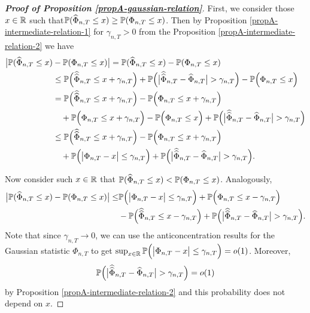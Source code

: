 \documentclass[a4paper,12pt]{article}
\makeatletter
\renewcommand{\eqref}[1]{\tagform@{\ref{#1}}}
\newcommand{\doublehattwo}[1]{\widehat{\widehat{#1}}}
\makeatother
\begin{document}
\begin{proof}[\textnormal{\textbf{Proof of Proposition \ref{propA-gaussian-relation}}}] 
First, we consider those $x\in \mathbb{R}$ such that\linebreak $\mathbb{P}(\widehat{\Phi}_{n,T} \le x) \geq \mathbb{P}(\Phi_{n, T} \le x)$. Then by Proposition \ref{propA-intermediate-relation-1} for $\gamma_{n, T}>0$ from the Proposition \ref{propA-intermediate-relation-2} we have
\begin{align*}
\big| \pr(\widehat{\Phi}_{n, T} \le x) &- \pr(\Phi_{n,T} \le x) \big| = \pr(\widehat{\Phi}_{n, T} \le x) - \pr(\Phi_{n,T} \le x)  \\
&\le \pr\Big(\doublehattwo{\Phi}_{n,T} \le x + \gamma_{n, T}\Big) + \pr \Big(\big|\doublehattwo{\Phi}_{n,T} - \widehat{\Phi}_{n,T}\big| > \gamma_{n, T} \Big)   - \pr\Big(\Phi_{n,T} \le x\Big)  \\
&= \pr\Big(\doublehattwo{\Phi}_{n,T} \le x + \gamma_{n, T}\Big) - \pr\Big(\Phi_{n,T} \le x + \gamma_{n, T}\Big)  \\
& \quad +  \pr\Big(\Phi_{n,T} \le x + \gamma_{n, T}\Big)   - \pr\Big(\Phi_{n,T} \le x\Big) + \pr \Big(\big|\doublehattwo{\Phi}_{n,T} - \widehat{\Phi}_{n,T}\big| > \gamma_{n, T} \Big) \\
&\le \pr\Big(\doublehattwo{\Phi}_{n,T} \le x + \gamma_{n, T}\Big) - \pr\Big(\Phi_{n,T} \le x + \gamma_{n, T}\Big) \\
&\quad + \pr\Big(\big|\Phi_{n,T} - x \big| \le \gamma_{n, T}\Big) + \pr \Big(\big|\doublehattwo{\Phi}_{n,T} - \widehat{\Phi}_{n,T}\big| > \gamma_{n, T} \Big).
\end{align*}

Now consider such $x\in \mathbb{R}$ that $\mathbb{P}(\widehat{\Phi}_{n,T}\le x) < \mathbb{P}(\Phi_{n, T}\le x)$. Analogously, 
\begin{align*}
\big| \pr(\widehat{\Phi}_{n, T} \le x) - \pr(\Phi_{n,T} \le x) \big| \le &\pr\Big(\big|\Phi_{n,T} - x \big| \le \gamma_{n, T}\Big) +\pr\Big(\Phi_{n,T} \le x - \gamma_{n, T}\Big)\\
& -\pr\Big(\doublehattwo{\Phi}_{n,T} \le x - \gamma_{n, T}\Big) +  \pr \Big(\big|\doublehattwo{\Phi}_{n,T} - \widehat{\Phi}_{n,T}\big| > \gamma_{n, T} \Big).  
\end{align*}
Note that since $\gamma_{n,T} \to 0$, we can use the anticoncentration results \eqref{eq-anticon-equality} for the Gaussian statistic $\Phi_{n,T}$ to get $\sup_{x\in \mathbb{R}}\mathbb{P}\Big(\big|\Phi_{n,T} - x \big| \le \gamma_{n, T}\Big) = o(1)$. Moreover, $$\pr \Big(\big|\doublehattwo{\Phi}_{n,T} - \widehat{\Phi}_{n,T}\big| > \gamma_{n, T} \Big) = o(1)$$ by Proposition \ref{propA-intermediate-relation-2} and this probability does not depend on $x$.


\end{proof}
\end{document}
